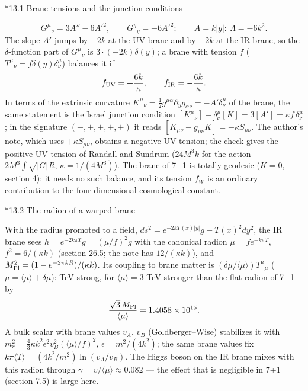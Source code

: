 \documentclass[10pt,a4paper]{article}
\makeatletter
\renewcommand\subsection{\@startsection{subsection}{2}{\z@}{-3.25ex\@plus -1ex \@minus -.2ex}{1.5ex \@plus .2ex}{\normalfont\large\bfseries\raggedright}}
\makeatother
\begin{document}
\subsection*{13.1 Brane tensions and the junction conditions}
\begin{equation*}
G^\mu{}_\nu=3A''-6A'^2,\qquad G^y{}_y=-6A'^2;\qquad A=k|y|:\ \Lambda=-6k^2 .
\end{equation*}
The slope $A'$ jumps by $+2k$ at the UV brane and by $-2k$ at the IR brane, so the $\delta$-function part of $G^\mu{}_\nu$ is $3\cdot(\pm2k)\delta(y)$; a brane with tension $f$ ($T^\mu{}_\nu=f\delta(y)\delta^\mu_\nu$) balances it if
\begin{equation*}
f_{\rm UV}=+\frac{6k}\kappa,\qquad f_{\rm IR}=-\frac{6k}\kappa .
\end{equation*}
In terms of the extrinsic curvature $K^\mu{}_\nu=\frac12g^{\mu\alpha}\partial_yg_{\alpha\nu}=-A'\delta^\mu_\nu$ of the brane, the same statement is the Israel junction condition $[K^\mu{}_\nu]-\delta^\mu_\nu[K]=3[A']=\kappa f\,\delta^\mu_\nu$; in the signature $(-,+,+,+,+)$ it reads $[K_{\mu\nu}-g_{\mu\nu}K]=-\kappa S_{\mu\nu}$. The author’s note, which uses $+\kappa S_{\mu\nu}$, obtains a negative UV tension; the check gives the positive UV tension of Randall and Sundrum ($24M^3k$ for the action $2M^3\int\sqrt{|G|}R$, $\kappa=1/(4M^3)$). The brane of 7+1 is totally geodesic ($K=0$, section 4): it needs no such balance, and its tension $f_W$ is an ordinary contribution to the four-dimensional cosmological constant.

\subsection*{13.2 The radion of a warped brane}
With the radius promoted to a field, $ds^2=e^{-2kT(x)|y|}g-T(x)^2dy^2$, the IR brane sees $h=e^{-2k\pi T}g=(\mu/f)^2g$ with the canonical radion $\mu=fe^{-k\pi T}$, $f^2=6/(\kappa k)$ (section 26.5; the note has $12/(\kappa k)$), and $M_{\rm Pl}^2=(1-e^{-2\pi kR})/(\kappa k)$. Its coupling to brane matter is $(\delta\mu/\langle\mu\rangle)T^\mu{}_\mu$ ($\mu=\langle\mu\rangle+\delta\mu$): TeV-strong, for $\langle\mu\rangle=3$ TeV stronger than the flat radion of 7+1 by
\begin{equation*}
\frac{\sqrt3\,M_{\rm Pl}}{\langle\mu\rangle}=1.4058\times10^{15} .
\end{equation*}
A bulk scalar with brane values $v_A$, $v_B$ (Goldberger–Wise) stabilizes it with $m_r^2=\frac43\kappa k^2\epsilon^2v_B^2(\langle\mu\rangle/f)^2$, $\epsilon=m^2/(4k^2)$; the same brane values fix $k\pi\langle T\rangle=(4k^2/m^2)\ln(v_A/v_B)$. The Higgs boson on the IR brane mixes with this radion through $\gamma=v/\langle\mu\rangle\approx0.082$ — the effect that is negligible in 7+1 (section 7.5) is large here.
\end{document}
